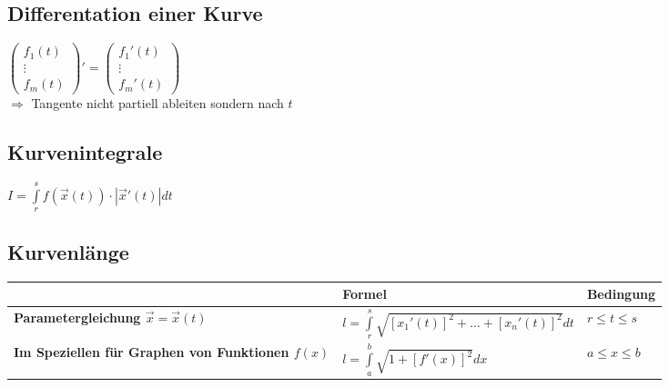 \begin{multicols}{2}  
  \subsection{Differentation einer Kurve}
    $\boxed{\begin{pmatrix}
      f_1(t) \\
      \vdots \\
      f_m(t)
    \end{pmatrix}' = \begin{pmatrix}
      f_1'(t)\\
      \vdots\\
      f_m'(t)
    \end{pmatrix}}$ \\
    $\Rightarrow$ Tangente nicht partiell ableiten sondern nach $t$
  \columnbreak  
  
  \subsection{Kurvenintegrale}
    $\boxed{I = \int\limits_r^s f(\vec x(t)) \cdot |\vec x'(t)| dt}$
\end{multicols}

\subsection{Kurvenlänge}
\begin{tabular}{|l||l|l|}
\hline
& \textbf{Formel} & \textbf{Bedingung}\\
\hline
\hline
\textbf{Parametergleichung $\vec{x}=\vec{x}(t)$} &
	\begin{minipage}{6cm}
    	\vspace{0.1cm}
		$l=\int\limits_r^s\sqrt{[x_1'(t)]^2+\ldots+[x_n'(t)]^2}dt$ 
		\vspace{0.1cm}
    \end{minipage}&
  $r\leq t\leq s$\\
\hline
\textbf{Im Speziellen für Graphen von Funktionen $f(x)$} &
	\begin{minipage}{6cm}
    	\vspace{0.1cm}
		$l=\int\limits_a^b\sqrt{1+[f'(x)]^2}dx$ 
		\vspace{0.1cm}
    \end{minipage}&
  $a\leq x \leq b$\\
\hline
\end{tabular}\vspace{0.5cm}\\





